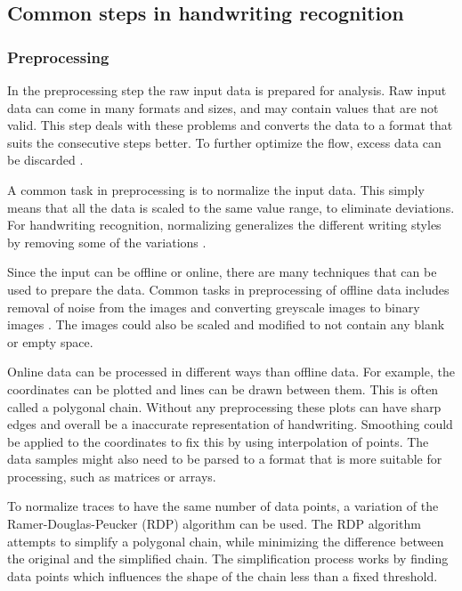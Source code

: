 \subsection{Common steps in handwriting recognition}

\subsubsection{Preprocessing}

In the preprocessing step the raw input data is prepared for analysis. Raw input data can come in many formats and sizes, and may contain values that are not valid. This step deals with these problems and converts the data to a format that suits the consecutive steps better. To further optimize the flow, excess data can be discarded \cite{huang_preprocessing_2007}.

A common task in preprocessing is to normalize the input data. This simply means that all the data is scaled to the same value range, to eliminate deviations. For handwriting recognition, normalizing generalizes the different writing styles by removing some of the variations \cite{huang_preprocessing_2007}.

Since the input can be offline or online, there are many techniques that can be used to prepare the data. Common tasks in preprocessing of offline data includes removal of noise from the images and converting greyscale images to binary images \cite{priya_online_2016}. The images could also be scaled and modified to not contain any blank or empty space.

Online data can be processed in different ways than offline data. For example, the coordinates can be plotted and lines can be drawn between them. This is often called a polygonal chain. Without any preprocessing these plots can have sharp edges and overall be a inaccurate representation of handwriting. Smoothing could be applied to the coordinates to fix this by using interpolation of points. The data samples might also need to be parsed to a format that is more suitable for processing, such as matrices or arrays.

To normalize traces to have the same number of data points, a variation of the Ramer-Douglas-Peucker (RDP) \cite{h_algorithms_2011} algorithm can be used. The RDP algorithm attempts to simplify a polygonal chain, while minimizing the difference between the original and the simplified chain. The simplification process works by finding data points which influences the shape of the chain less than a fixed threshold.


